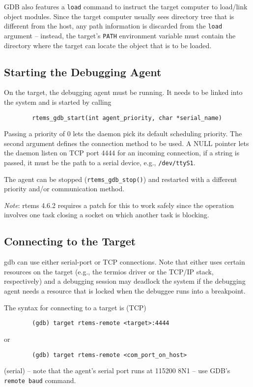 \documentclass{article}
\newcommand{\cmd}[1]{{\tt #1}}
\begin{document}
	GDB also features a \cmd{load} command to instruct the target
	computer to load/link object modules. Since the target
	computer usually sees directory tree that is different
	from the host, any path information is discarded from the
	\cmd{load} argument -- instead, the target's {\tt PATH} environment
	variable must contain the directory where the target can
	locate the object that is to be loaded.

\subsection{Starting the Debugging Agent}
	On the target, the debugging agent must be running.
	It needs to be linked into the system and is started
	by calling
\begin{verbatim}
		rtems_gdb_start(int agent_priority, char *serial_name)
\end{verbatim}

	Passing a priority of 0 lets the daemon pick its default
	scheduling priority. The second argument defines the
	connection method to be used. A NULL pointer lets the
	daemon listen on TCP port 4444 for an incoming connection,
	if a string is passed, it must be the path to a serial
	device, e.g., {\tt /dev/ttyS1}.

	The agent can be stopped (\verb|rtems_gdb_stop()|) and restarted
	with a different priority and/or communication method.

	{\em Note\/}: rtems 4.6.2 requires a patch for this to work safely
	since the operation involves one task closing a socket
	on which another task is blocking.

\subsection{Connecting to the Target}
	gdb can use either serial-port or TCP connections. Note
	that either uses certain resources on the target (e.g.,
	the termios driver or the TCP/IP stack, respectively)
	and a debugging session may deadlock the system if
	the debugging agent needs a resource that is locked
	when the debuggee runs into a breakpoint.

	The syntax for connecting to a target is (TCP)
\begin{verbatim}
		(gdb) target rtems-remote <target>:4444
\end{verbatim}
	or
\begin{verbatim}
		(gdb) target rtems-remote <com_port_on_host>
\end{verbatim}
	(serial) -- note that the agent's serial port runs at
	115200 8N1 -- use GDB's \cmd{remote baud} command.
\end{document}
